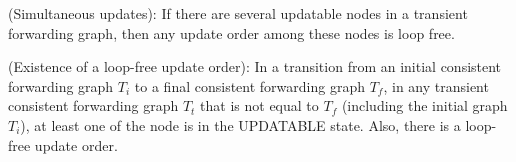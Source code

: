 \begin{theorem} (Simultaneous updates): If there are several updatable nodes in
a transient forwarding graph, then any update order among these nodes is
loop free.  
\end{theorem}

%
\begin{theorem} (Existence of a loop-free update order): In a transition from
an initial consistent forwarding graph $T_i$ to a final consistent forwarding
graph $T_f$, in any transient consistent forwarding graph $T_t$ that is not
equal to $T_f$ (including the initial graph $T_i$), at least one of the node is in
the UPDATABLE state. Also, there is a loop-free update order.  
\end{theorem}

%

